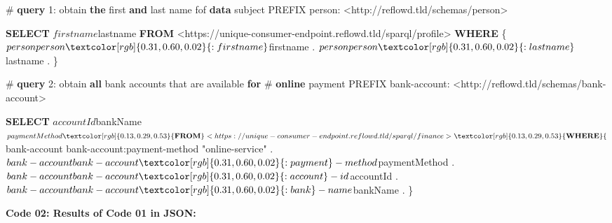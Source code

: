 \documentclass[12pt,english,a4paper,titlepage,cleardoublepage=empty,dottedtoc]{report}
\newenvironment{Shaded}{\begin{snugshade}}{\end{snugshade}}
\newcommand{\KeywordTok}[1]{\textcolor[rgb]{0.13,0.29,0.53}{\textbf{#1}}}
\newcommand{\DecValTok}[1]{\textcolor[rgb]{0.00,0.00,0.81}{#1}}
\newcommand{\CharTok}[1]{\textcolor[rgb]{0.31,0.60,0.02}{#1}}
\newcommand{\OtherTok}[1]{\textcolor[rgb]{0.56,0.35,0.01}{#1}}
\newcommand{\FunctionTok}[1]{\textcolor[rgb]{0.00,0.00,0.00}{#1}}
\newcommand{\NormalTok}[1]{#1}
\begin{document}
\begin{Shaded}
\begin{Highlighting}[numbers=left,,]
\NormalTok{# }\KeywordTok{query} \DecValTok{1}\NormalTok{: obtain }\KeywordTok{the} \FunctionTok{first} \KeywordTok{and} \FunctionTok{last}\NormalTok{ name fof }\KeywordTok{data}\NormalTok{ subject}
\NormalTok{PREFIX person: <http://reflowd.tld/schemas/person>}

\KeywordTok{SELECT}\NormalTok{ $firstname $lastname}
\KeywordTok{FROM}\NormalTok{ <https://unique-consumer-endpoint.reflowd.tld/sparql/profile>}
\KeywordTok{WHERE}\NormalTok{ \{}
\NormalTok{    $person person}\CharTok{:firstname}\NormalTok{ $firstname .}
\NormalTok{    $person person}\CharTok{:lastname}\NormalTok{ $lastname .}
\NormalTok{\}}


\NormalTok{# }\KeywordTok{query} \DecValTok{2}\NormalTok{: obtain }\KeywordTok{all}\NormalTok{ bank accounts that are available }\KeywordTok{for} 
\NormalTok{# }\KeywordTok{online}\NormalTok{ payment}
\NormalTok{PREFIX bank-account: <http://reflowd.tld/schemas/bank-account>}

\KeywordTok{SELECT}\NormalTok{ $accountId $bankName $paymentMethod}
\KeywordTok{FROM}\NormalTok{ <https://unique-consumer-endpoint.reflowd.tld/sparql/finance>}
\KeywordTok{WHERE}\NormalTok{ \{}
\NormalTok{    $bank-account bank-account}\CharTok{:payment}\NormalTok{-method }\OtherTok{"online-service"}\NormalTok{ .}
\NormalTok{    $bank-account bank-account}\CharTok{:payment}\NormalTok{-method $paymentMethod .}
\NormalTok{    $bank-account bank-account}\CharTok{:account}\NormalTok{-id $accountId . }
\NormalTok{    $bank-account bank-account}\CharTok{:bank}\NormalTok{-name $bankName .}
\NormalTok{\}}
\end{Highlighting}
\end{Shaded}

\newpage

\textbf{\protect\hypertarget{code-02_sparql-query-results}{}{Code 02:
Results of Code 01 in JSON}:}
\end{document}
